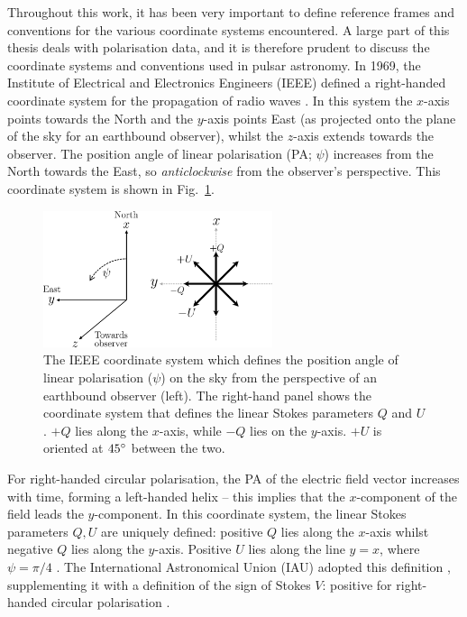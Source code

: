 Throughout this work, it has been very important to define reference frames and conventions for the various coordinate systems encountered. A large part of this thesis deals with polarisation data, and it is therefore prudent to discuss the coordinate systems and conventions used in pulsar astronomy. In 1969, the Institute of Electrical and Electronics Engineers (IEEE) defined a right-handed coordinate system for the propagation of radio waves \citep[][still valid as of 2019]{IEEE1969}. In this system the $x$-axis points towards the North and the $y$-axis points East (as projected onto the plane of the sky for an earthbound observer), whilst the $z$-axis extends towards the observer. The position angle of linear polarisation (PA; $\psi$) increases from the North towards the East, so \textit{anticlockwise} from the observer's perspective. This coordinate system is shown in Fig.~\ref{fig: intro - IEEE polarisation frame}.
\begin{figure}
    \begin{center}
        \includegraphics[width=0.6\textwidth]{Figures/Introduction/IEEE_coordinate_system}
        \caption[Reference frame of IEEE polarisation conventions]{The IEEE coordinate system which defines the position angle of linear polarisation ($\psi$) on the sky from the perspective of an earthbound observer (left). The right-hand panel shows the coordinate system that defines the linear Stokes parameters $Q$ and $U$. $+Q$ lies along the $x$-axis, while $-Q$ lies on the $y$-axis. $+U$ is oriented at $45^\circ$ between the two. }
        \label{fig: intro - IEEE polarisation frame}
    \end{center}
\end{figure}
For right-handed circular polarisation, the PA of the electric field vector increases with time, forming a left-handed helix -- this implies that the $x$-component of the field leads the $y$-component. In this coordinate system, the linear Stokes parameters $Q,U$ are uniquely defined: positive $Q$ lies along the $x$-axis whilst negative $Q$ lies along the $y$-axis. Positive $U$ lies along the line $y=x$, where $\psi=\pi / 4$ \citep{HBxx1996}. The International Astronomical Union (IAU) adopted this definition \citep{IAU1974}, supplementing it with a definition of the sign of Stokes $V$: positive for right-handed circular polarisation \citep{Wxxx1973,TMSx1986}.

